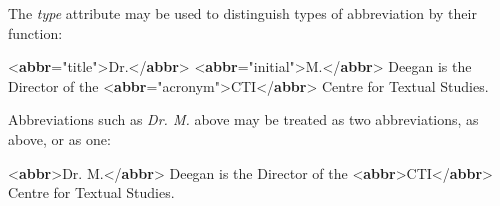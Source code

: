 The {\itshape type} attribute may be used to distinguish types of abbreviation by their function:\par\bgroup{}\exampleFont \begin{shaded}\noindent\mbox{}{<\textbf{abbr}\hspace*{1em}{type}="{title}">}Dr.{</\textbf{abbr}>}\mbox{}\newline 
{<\textbf{abbr}\hspace*{1em}{type}="{initial}">}M.{</\textbf{abbr}>} Deegan is\mbox{}\newline 
 the Director of the {<\textbf{abbr}\hspace*{1em}{type}="{acronym}">}CTI{</\textbf{abbr}>} Centre for Textual Studies.\end{shaded}\egroup\par \par
Abbreviations such as \textit{Dr. M.} above may be treated as two abbreviations, as above, or as one: \par\bgroup{}\exampleFont \begin{shaded}\noindent\mbox{}{<\textbf{abbr}>}Dr. M.{</\textbf{abbr}>} Deegan is\mbox{}\newline 
 the Director of the {<\textbf{abbr}>}CTI{</\textbf{abbr}>} Centre for Textual Studies.\end{shaded}\egroup\par \par
